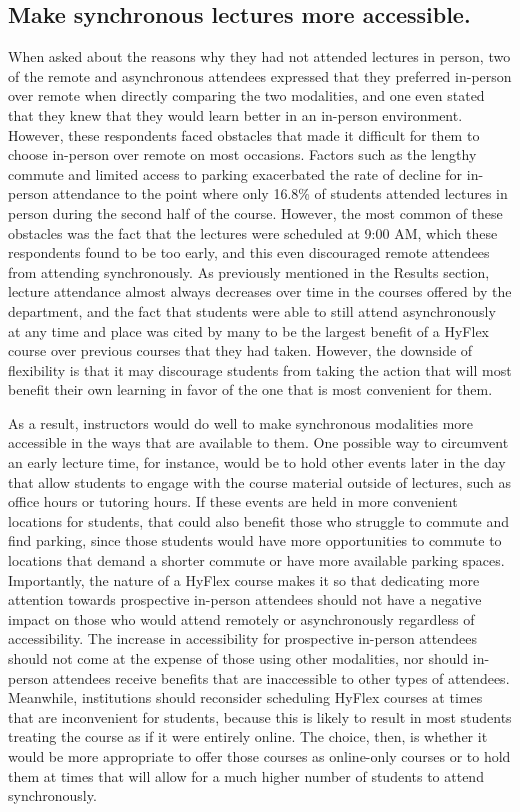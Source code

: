 \subsection{Make synchronous lectures more accessible.}

When asked about the reasons why they had not attended lectures in person, two of the remote and asynchronous attendees expressed that they preferred in-person over remote when directly comparing the two modalities, and one even stated that they knew that they would learn better in an in-person environment. However, these respondents faced obstacles that made it difficult for them to choose in-person over remote on most occasions. Factors such as the lengthy commute and limited access to parking exacerbated the rate of decline for in-person attendance to the point where only 16.8\% of students attended lectures in person during the second half of the course. However, the most common of these obstacles was the fact that the lectures were scheduled at 9:00 AM, which these respondents found to be too early, and this even discouraged remote attendees from attending synchronously. As previously mentioned in the Results section, lecture attendance almost always decreases over time in the courses offered by the department, and the fact that students were able to still attend asynchronously at any time and place was cited by many to be the largest benefit of a HyFlex course over previous courses that they had taken. However, the downside of flexibility is that it may discourage students from taking the action that will most benefit their own learning in favor of the one that is most convenient for them.

As a result, instructors would do well to make synchronous modalities more accessible in the ways that are available to them. One possible way to circumvent an early lecture time, for instance, would be to hold other events later in the day that allow students to engage with the course material outside of lectures, such as office hours or tutoring hours. If these events are held in more convenient locations for students, that could also benefit those who struggle to commute and find parking, since those students would have more opportunities to commute to locations that demand a shorter commute or have more available parking spaces. Importantly, the nature of a HyFlex course makes it so that dedicating more attention towards prospective in-person attendees should not have a negative impact on those who would attend remotely or asynchronously regardless of accessibility. The increase in accessibility for prospective in-person attendees should not come at the expense of those using other modalities, nor should in-person attendees receive benefits that are inaccessible to other types of attendees. Meanwhile, institutions should reconsider scheduling HyFlex courses at times that are inconvenient for students, because this is likely to result in most students treating the course as if it were entirely online. The choice, then, is whether it would be more appropriate to offer those courses as online-only courses or to hold them at times that will allow for a much higher number of students to attend synchronously.

